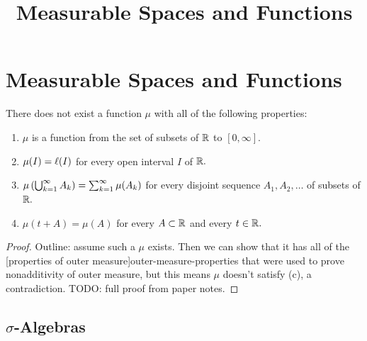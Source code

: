 \documentclass{article}
\title{Measurable Spaces and Functions}
\begin{document}
\section{Measurable Spaces and Functions}

\begin{theorem}
	There does not exist a \@{function} $\mu$ with all of the following properties:

	\begin{enumerate}[label=(\alph*)]
		\item $\mu$ is a \@{function} from the \@{set} of \@{subsets} of $\mathbb{R}$ to $[0, \infty].$
		\item $\mu(I) = \ell(I)$ for every \@{open interval} $I$ of $\mathbb{R}.$
		\item $\mu \left(\bigcup_{k=1}^{\infty} A_k\right) = \sum_{k=1}^{\infty} \mu(A_k)$ for every \@{disjoint} \@{sequence} $A_1, A_2, \dots$ of \@{subsets} of $\mathbb{R}.$
		\item $\mu(t + A) = \mu(A)$ for every $A \subset \mathbb{R}$ and every $t \in \mathbb{R}.$
	\end{enumerate}
\end{theorem}
\begin{proof}
	Outline: assume such a $\mu$ exists. Then we can show that it has all of the \@[properties of outer measure]{outer-measure-properties} that were used to prove \@{nonadditivity of outer measure}, but this means $\mu$ doesn't satisfy (c), a contradiction.
	TODO: full proof from paper notes.
\end{proof}

\subsection{$\sigma$-Algebras}
\end{document}
